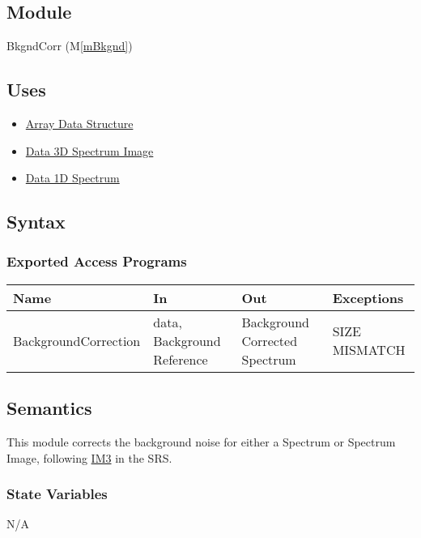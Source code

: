 \documentclass[12pt, titlepage]{article}
\newcommand{\mref}[1]{M\ref{#1}}
\begin{document}
\subsection{Module}
BkgndCorr (\mref{mBkgnd})

\subsection{Uses}
\begin{itemize}
    \item \hyperref[Mod:Array]{Array Data Structure}
    \item \hyperref[Mod:SI]{Data 3D Spectrum Image}
    \item \hyperref[Mod:Spectrum]{Data 1D Spectrum}
\end{itemize}

\subsection{Syntax}

\subsubsection{Exported Access Programs}
\begin{center}
    \begin{tabular}{p{4cm} p{3.5cm} p{4cm} p{3cm}}
        \hline
        \textbf{Name} & \textbf{In} & \textbf{Out} & \textbf{Exceptions} \\
        \hline
        BackgroundCorrection & data, Background Reference & Background Corrected
        Spectrum & SIZE MISMATCH \\
        \hline
    \end{tabular}
\end{center}

\subsection{Semantics}
This module corrects the background noise for either a Spectrum or Spectrum
Image, following \hyperref[background]{IM3} in the SRS.

\subsubsection{State Variables}
N/A
\end{document}
